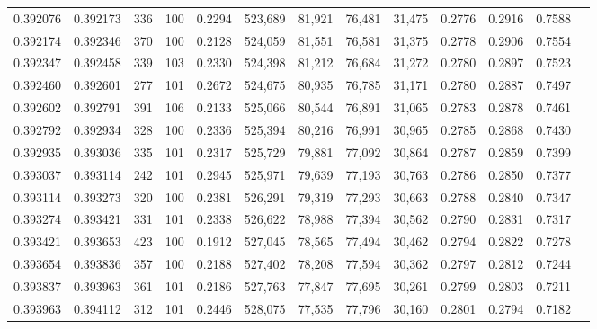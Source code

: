 \begin{tabular}{rrrrrrrrrrrrr}
0.392076 & 0.392173 &   336 & 100 &                                     0.2294 & 523,689 &  81,921 &  76,481 &  31,475 & 0.2776 & 0.2916 & 0.7588 \\
0.392174 & 0.392346 &   370 & 100 &                                     0.2128 & 524,059 &  81,551 &  76,581 &  31,375 & 0.2778 & 0.2906 & 0.7554 \\
0.392347 & 0.392458 &   339 & 103 &                                     0.2330 & 524,398 &  81,212 &  76,684 &  31,272 & 0.2780 & 0.2897 & 0.7523 \\
0.392460 & 0.392601 &   277 & 101 &                                     0.2672 & 524,675 &  80,935 &  76,785 &  31,171 & 0.2780 & 0.2887 & 0.7497 \\
0.392602 & 0.392791 &   391 & 106 &                                     0.2133 & 525,066 &  80,544 &  76,891 &  31,065 & 0.2783 & 0.2878 & 0.7461 \\
0.392792 & 0.392934 &   328 & 100 &                                     0.2336 & 525,394 &  80,216 &  76,991 &  30,965 & 0.2785 & 0.2868 & 0.7430 \\
0.392935 & 0.393036 &   335 & 101 &                                     0.2317 & 525,729 &  79,881 &  77,092 &  30,864 & 0.2787 & 0.2859 & 0.7399 \\
0.393037 & 0.393114 &   242 & 101 &                                     0.2945 & 525,971 &  79,639 &  77,193 &  30,763 & 0.2786 & 0.2850 & 0.7377 \\
0.393114 & 0.393273 &   320 & 100 &                                     0.2381 & 526,291 &  79,319 &  77,293 &  30,663 & 0.2788 & 0.2840 & 0.7347 \\
0.393274 & 0.393421 &   331 & 101 &                                     0.2338 & 526,622 &  78,988 &  77,394 &  30,562 & 0.2790 & 0.2831 & 0.7317 \\
0.393421 & 0.393653 &   423 & 100 &                                     0.1912 & 527,045 &  78,565 &  77,494 &  30,462 & 0.2794 & 0.2822 & 0.7278 \\
0.393654 & 0.393836 &   357 & 100 &                                     0.2188 & 527,402 &  78,208 &  77,594 &  30,362 & 0.2797 & 0.2812 & 0.7244 \\
0.393837 & 0.393963 &   361 & 101 &                                     0.2186 & 527,763 &  77,847 &  77,695 &  30,261 & 0.2799 & 0.2803 & 0.7211 \\
0.393963 & 0.394112 &   312 & 101 &                                     0.2446 & 528,075 &  77,535 &  77,796 &  30,160 & 0.2801 & 0.2794 & 0.7182 \\

\end{tabular}
